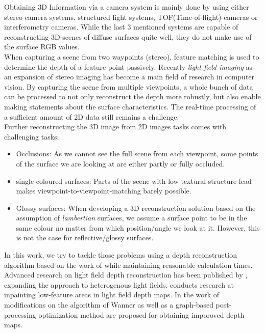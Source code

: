 \documentclass  [
  paper    = a4,
  BCOR     = 10mm,
  twoside,
  fontsize = 12pt,
  fleqn,
  toc      = bibnumbered,
  toc      = listofnumbered,
  numbers  = noendperiod,
  headings = normal,
  listof   = leveldown,
  version  = 3.03
]                                       {scrreprt}
\begin{document}
Obtaining 3D Information via a camera system is mainly done by using either stereo camera systems, structured light systems, TOF(Time-of-flight)-cameras or interferometry cameras. While the last 3 mentioned systems are capable of reconstructing 3D-scenes of diffuse surfaces quite well, they do not make use of the surface RGB values.\\
When capturing a scene from two waypoints (stereo), feature matching is used to determine the depth of a feature point passively. 
Recently \textit{light field imaging} as an expansion of stereo imaging has become a main field of research in computer vision. By capturing the scene from multiple viewpoints, a whole bunch of data can be processed to not only reconstruct the depth more robustly, but also enable making statements about the surface characteristics. The real-time processing of a sufficient amount of 2D data still remains a challenge. \\
Further reconstructing the 3D image from 2D images tasks comes with challenging tasks:
\begin{itemize}
	\item Occlusions: As we cannot see the full scene from each viewpoint, some points of the surface we are looking at are either partly or fully occluded.
	\item single-coloured surfaces: Parts of the scene with low textural structure lead makes viewpoint-to-viewpoint-matching barely possible.
	\item Glossy surfaces: When developing a 3D reconstruction solution based on the assumption of \textit{lambertian} surfaces, we assume a surface point to be in the same colour no matter from which position/angle we look at it. However,  this is not the case for reflective/glossy surfaces.
\end{itemize}
In this work, we try to tackle those problems using a depth reconstruction algorithm based on the work of \cite{wanner2014orientation} while maintaining reasonable calculation times.\\
Advanced research on light field depth reconstruction has been published by \cite{diebold2016light}, expanding the approach to heterogenous light fields. \cite{schoenpflug2017optimizing} conducts research at inpainting low-feature areas in light field depth maps. In the work of \cite{freist2018reconst} modifications on the algorithm of Wanner as well as a graph-based post-processing optimization method are proposed for obtaining imporoved depth maps.
\end{document}
